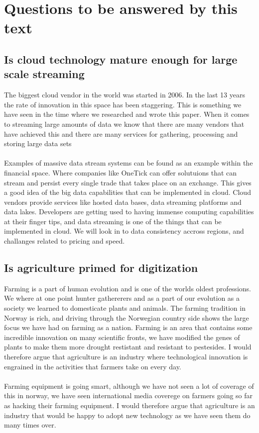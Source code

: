 \documentclass[]{uiophd}
\begin{document}
\section{Questions to be answered by this text}

\subsection{Is cloud technology mature enough for large scale streaming}
The biggest cloud vendor in the world was started in 2006. In the last 13 years the rate of innovation in this space has been staggering. This is something we have seen in the time where we researched and wrote this paper. When it comes to streaming large amounts of data we know that there are many vendors that have achieved this and there are many services for gathering, processing and storing large data sets
\\\\
Examples of massive data stream systems can be found as an example within the financial space. Where companies like OneTick can offer solutuions that can stream and persist every single trade that takes place on an exchange. This gives a good idea of the big data capabilities that can be implemented in cloud. Cloud vendors provide services like hosted data bases, data streaming platforms and data lakes. Developers are getting used to having immense computing capabilities at their finger tips, and data streaming is one of the things that can be implemented in cloud. We will look in to data consistency accross regions, and challanges related to pricing and speed.
\subsection{Is agriculture primed for digitization}
Farming is a part of human evolution and is one of the worlds oldest professions. We where at one point hunter gathererers and as a part of our evolution as a society we learned to domesticate plants and animals. The farming tradition in Norway is rich, and driving through the Norwegian country side shows the large focus we have had on farming as a nation. Farming is an area that contains some incredible innovation on many scientific fronts, we have modified the genes of plants to make them more drought restistant and resistant to pestesides. I would therefore argue that agriculture is an industry where technological innovation is engrained in the activities that farmers take on every day.
\\\\
Farming equipment is going smart, although we have not seen a lot of coverage of this in norway, we have seen international media coverege on farmers going so far as hacking their farming equipment. I would therefore argue that agriculture is an industry that would be happy to adopt new technology as we have seen them do many times over.
\end{document}
